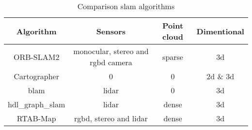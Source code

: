\begin{table}[!h]
  \centering
  \begin{tabular}{| c | c | c | c |}
    \hline
    \textbf{Algorithm} & \textbf{Sensors} & \textbf{Point cloud} & \textbf{Dimentional}\\
    \hline
    ORB\hyp{}SLAM2 & monocular, stereo and \acs{rgbd} camera & sparse & \acs{3d}\\
    \hline
    Cartographer & 0 & 0 & \acs{2d} \& \acs{3d}\\
    \hline
    \acs{blam} & \acs{lidar} & 0 & \acs{3d}\\
    \hline
    hdl\_graph\_slam & \acs{lidar} & dense & \acs{3d}\\
    \hline
    RTAB-Map & \acs{rgbd}, stereo and \acs{lidar} & dense & \acs{3d}\\
    \hline
  \end{tabular}
  \caption{Comparison \acs{slam} algorithms}
\end{table}